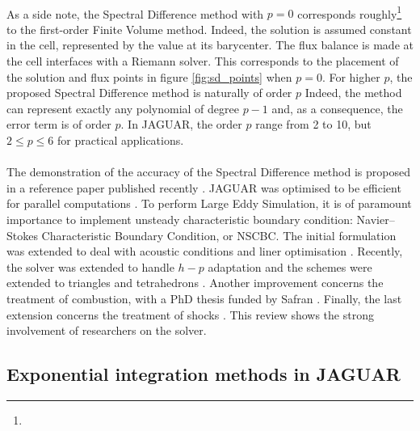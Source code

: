       \paragraph{}
      As a side note, the Spectral Difference method with $p = 0$ corresponds roughly\footnote{} to the first-order Finite Volume method.
      Indeed, the solution is assumed constant in the cell, represented by the value at its barycenter.
      The flux balance is made at the cell interfaces with a Riemann solver.
      This corresponds to the placement of the solution and flux points in figure \ref{fig:sd_points} when $p = 0$.
      For higher $p$, the proposed Spectral Difference method is naturally of order $p$
      Indeed, the method can represent exactly any polynomial of degree $p\!-\!1$ and, as a consequence, the error term is of order $p$.
      In JAGUAR, the order $p$ range from 2 to 10, but $2 \le p \le 6$ for practical applications.

      \paragraph{}
      The demonstration of the accuracy of the Spectral Difference method is proposed in a reference paper published recently \cite{VanharenPuigtVasseurEtAl2017}.
      JAGUAR was optimised to be efficient for parallel computations \cite{Cassagne2014, CassagnePuigtBoussuge2015, Marait2015}.
      To perform Large Eddy Simulation, it is of paramount importance to implement unsteady characteristic boundary condition: Navier--Stokes Characteristic Boundary Condition, or NSCBC.
      The initial formulation \cite{FievetDeniauPiot2020} was extended to deal with acoustic conditions and liner optimisation \cite{CardesaFievetPiotEtAl2022}.
      Recently, the solver was extended to handle $h-p$ adaptation \cite{HartmannBalanBassiEtAl2021} and the schemes were extended to triangles and tetrahedrons \cite{VeilleuxPuigtDeniauEtAl2022, VeilleuxPuigtDeniauEtAl2022a}.
      Another improvement concerns the treatment of combustion, with a PhD thesis funded by Safran \cite{MarchalDeniauBoussugeEtAl2021}.
      Finally, the last extension concerns the treatment of shocks \cite{DeniauPuigt2022}.
      This review shows the strong involvement of researchers on the solver.


    \subsection{Exponential integration methods in JAGUAR}

